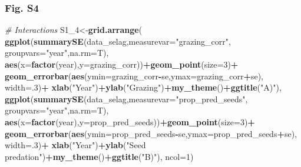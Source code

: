 \documentclass[
]{article}
\newenvironment{Shaded}{\begin{snugshade}}{\end{snugshade}}
\newcommand{\CommentTok}[1]{\textcolor[rgb]{0.56,0.35,0.01}{\textit{#1}}}
\newcommand{\DataTypeTok}[1]{\textcolor[rgb]{0.13,0.29,0.53}{#1}}
\newcommand{\DecValTok}[1]{\textcolor[rgb]{0.00,0.00,0.81}{#1}}
\newcommand{\KeywordTok}[1]{\textcolor[rgb]{0.13,0.29,0.53}{\textbf{#1}}}
\newcommand{\NormalTok}[1]{#1}
\newcommand{\OperatorTok}[1]{\textcolor[rgb]{0.81,0.36,0.00}{\textbf{#1}}}
\newcommand{\StringTok}[1]{\textcolor[rgb]{0.31,0.60,0.02}{#1}}
\begin{document}
\hypertarget{fig.-s4}{%
\subsubsection{Fig. S4}\label{fig.-s4}}

\begin{Shaded}
\begin{Highlighting}[]
\CommentTok{\# Interactions}
\NormalTok{S1\_}\DecValTok{4}\NormalTok{\textless{}{-}}\KeywordTok{grid.arrange}\NormalTok{(}
  \KeywordTok{ggplot}\NormalTok{(}\KeywordTok{summarySE}\NormalTok{(data\_selag,}\DataTypeTok{measurevar=}\StringTok{"grazing\_corr"}\NormalTok{,}
                   \DataTypeTok{groupvars=}\StringTok{"year"}\NormalTok{,}\DataTypeTok{na.rm=}\NormalTok{T),}
         \KeywordTok{aes}\NormalTok{(}\DataTypeTok{x=}\KeywordTok{factor}\NormalTok{(year),}\DataTypeTok{y=}\NormalTok{grazing\_corr))}\OperatorTok{+}\KeywordTok{geom\_point}\NormalTok{(}\DataTypeTok{size=}\DecValTok{3}\NormalTok{)}\OperatorTok{+}
\StringTok{    }\KeywordTok{geom\_errorbar}\NormalTok{(}\KeywordTok{aes}\NormalTok{(}\DataTypeTok{ymin=}\NormalTok{grazing\_corr}\OperatorTok{{-}}\NormalTok{se,}\DataTypeTok{ymax=}\NormalTok{grazing\_corr}\OperatorTok{+}\NormalTok{se),}
                  \DataTypeTok{width=}\NormalTok{.}\DecValTok{3}\NormalTok{)}\OperatorTok{+}
\StringTok{    }\KeywordTok{xlab}\NormalTok{(}\StringTok{"Year"}\NormalTok{)}\OperatorTok{+}\KeywordTok{ylab}\NormalTok{(}\StringTok{"Grazing"}\NormalTok{)}\OperatorTok{+}\KeywordTok{my\_theme}\NormalTok{()}\OperatorTok{+}\KeywordTok{ggtitle}\NormalTok{(}\StringTok{"A)"}\NormalTok{),}
  \KeywordTok{ggplot}\NormalTok{(}\KeywordTok{summarySE}\NormalTok{(data\_selag,}\DataTypeTok{measurevar=}\StringTok{"prop\_pred\_seeds"}\NormalTok{,}
                   \DataTypeTok{groupvars=}\StringTok{"year"}\NormalTok{,}\DataTypeTok{na.rm=}\NormalTok{T),}
         \KeywordTok{aes}\NormalTok{(}\DataTypeTok{x=}\KeywordTok{factor}\NormalTok{(year),}\DataTypeTok{y=}\NormalTok{prop\_pred\_seeds))}\OperatorTok{+}\KeywordTok{geom\_point}\NormalTok{(}\DataTypeTok{size=}\DecValTok{3}\NormalTok{)}\OperatorTok{+}
\StringTok{    }\KeywordTok{geom\_errorbar}\NormalTok{(}\KeywordTok{aes}\NormalTok{(}\DataTypeTok{ymin=}\NormalTok{prop\_pred\_seeds}\OperatorTok{{-}}\NormalTok{se,}\DataTypeTok{ymax=}\NormalTok{prop\_pred\_seeds}\OperatorTok{+}\NormalTok{se),}
                  \DataTypeTok{width=}\NormalTok{.}\DecValTok{3}\NormalTok{)}\OperatorTok{+}
\StringTok{    }\KeywordTok{xlab}\NormalTok{(}\StringTok{"Year"}\NormalTok{)}\OperatorTok{+}\KeywordTok{ylab}\NormalTok{(}\StringTok{"Seed predation"}\NormalTok{)}\OperatorTok{+}\KeywordTok{my\_theme}\NormalTok{()}\OperatorTok{+}\KeywordTok{ggtitle}\NormalTok{(}\StringTok{"B)"}\NormalTok{),}
  \DataTypeTok{ncol=}\DecValTok{1}\NormalTok{)}
\end{Highlighting}
\end{Shaded}
\end{document}
